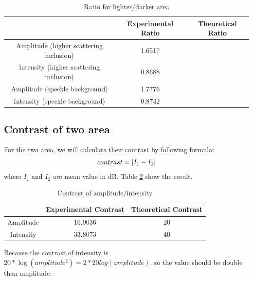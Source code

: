 \documentclass{article}
\DeclarePairedDelimiter\abs{\lvert}{\rvert}%
\begin{document}
\begin{table}[H]
  \centering
    \begin{tabular}{|c|c|c|}
    \hline
          & Experimental Ratio & Theoretical Ratio \bigstrut\\
    \hline
    Amplitude (higher scattering inclusion) &   1.6517    &  \bigstrut\\
    \hline
    Intensity (higher scattering inclusion) &   0.8688    &  \bigstrut\\
    \hline
    Amplitude (speckle background) &   1.7776    &  \bigstrut\\
    \hline
    Intensity (speckle background) &   0.8742    &  \bigstrut\\
    \hline
    \end{tabular}%
  \caption{Ratio for lighter/darker area}
  \label{tab:ratio}%
\end{table}%

\subsection{Contrast of two area}
For the two area, we will calculate their contrast by following formula:
$$
	contrast = \abs{I_1 - I_2}
$$
where $I_1$ and $I_2$ are mean value in dB. Table \ref{tab:contrast} show the result.
\begin{table}[H]
  \centering
  
    \begin{tabular}{|c|c|c|}
    \hline
          & Experimental Contrast & Theoretical Contrast \bigstrut\\
    \hline
    Amplitude & 16.9036 & 20 \bigstrut\\
    \hline
    Intensity & 33.8073 & 40 \bigstrut\\
    \hline
    \end{tabular}%
    \caption{Contrast of amplitude/intensity}
  \label{tab:contrast}%
\end{table}%
Because the contrast of intensity is $20 * \log(amplitude^2) = 2 * 20 log(amplitude)$, so the value should be double than amplitude.
\end{document}
